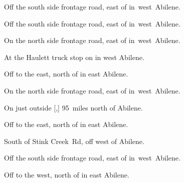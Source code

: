 
\begin{LocationList}

Off the south side  frontage road, east of  in~west~Abilene.

Off the south side  frontage road, east of  in~west~Abilene.

\Location{\GarageHQ \Garage}
On the north side  frontage road, east of  in~west~Abilene.

At the Haulett truck stop on  in west Abilene.

Off  to the east, north of  in east Abilene.

On the north side  frontage road, east of  in~west~Abilene.

On  just outside [,] 95~miles north of Abilene.

Off  to the east, north of  in east Abilene.

South of Stink Creek~Rd, off   west of Abilene.

Off the south side  frontage road, east of  in~west~Abilene.

Off  to the west, north of  in east Abilene.

\end{LocationList}
